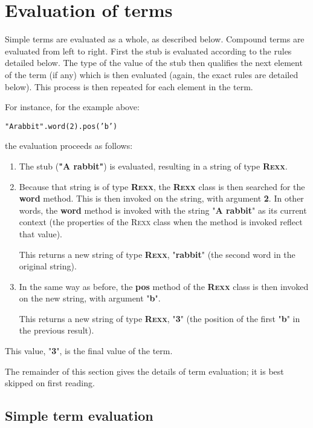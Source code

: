 \section{Evaluation of terms}\label{refteval}
 
Simple terms are evaluated as a whole, as described below.
Compound terms are evaluated from left to right.  First the stub is
evaluated according to the rules detailed below.
The type of the value of the stub then qualifies the next element of the
term (if any) which is then evaluated (again, the exact rules are
detailed below).
This process is then repeated for each element in the term.
 
For instance, for the example above:
\begin{alltt}
"A rabbit".word(2).pos('b')
\end{alltt}
the evaluation proceeds as follows:
\begin{enumerate}
\item The stub (\textbf{"A rabbit"}) is evaluated, resulting in a string
of type \textbf{R\textsc{exx}}.
\item 
Because that string is of type \textbf{R\textsc{exx}}, the \textbf{R\textsc{exx}} class
is then searched for the \textbf{word} method.  This is then invoked
on the string, with argument \textbf{2}.
In other words, the \textbf{word} method is invoked with the string
"\textbf{A rabbit}" as its current context (the properties of the
R\textsc{exx} class when the method is invoked reflect that value).
 
This returns a new string of type \textbf{R\textsc{exx}},
"\textbf{rabbit}" (the second word in the original string).
\item 
In the same way as before, the \textbf{pos} method of
the \textbf{R\textsc{exx}} class is then invoked on the new string, with
argument "\textbf{b}".
 
This returns a new string of type \textbf{R\textsc{exx}}, "\textbf{3}"
(the position of the first "\textbf{b}" in the previous result).
\end{enumerate}
This value, "\textbf{3}", is the final value of the term.
 
The remainder of this section gives the details of term
evaluation; it is best skipped on first reading.
\subsection{Simple term evaluation}
 
